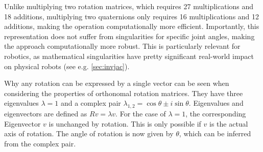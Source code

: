 Unlike multiplying two rotation matrices, which requires 27 multiplications and 18 additions, multiplying two quaternions only requires 16 multiplications and 12 additions, making the operation computationally more efficient.
Importantly, this representation does not suffer from singularities for specific joint angles, making the approach computationally more robust. This is particularly relevant for robotics, as mathematical singularities have pretty significant real-world impact on physical robots (see e.g. \cref{sec:invjac}).

Why any rotation can be expressed by a single vector can be seen when considering the properties of orthonomal rotation matrices. They have three eigenvalues $\lambda=1$ and a complex pair $\lambda_{1,2}=\cos \theta \pm i \sin \theta$.
Eigenvalues and eigenvectors are defined as $Rv=\lambda v$. For the case of $\lambda=1$, the corresponding Eigenvector $v$ is unchanged by rotation. This is only possible if $v$ is the actual axis of rotation.
The angle of rotation is now given by $\theta$, which can be inferred from the complex pair.
